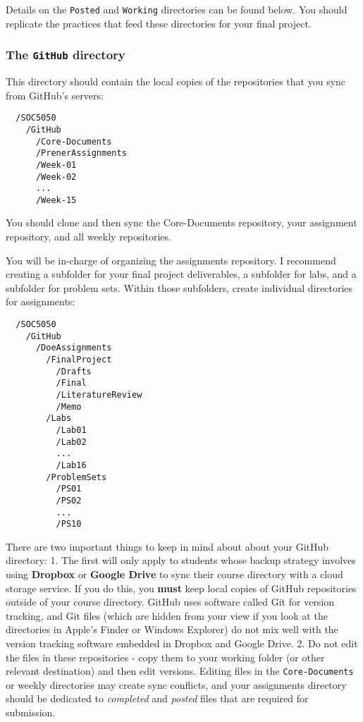 \documentclass[]{book}
\begin{document}
Details on the \texttt{Posted} and \texttt{Working} directories can be
found below. You should replicate the practices that feed these
directories for your final project.

\subsubsection{\texorpdfstring{The \texttt{GitHub}
directory}{The GitHub directory}}\label{the-github-directory}

This directory should contain the local copies of the repositories that
you sync from GitHub's servers:

\begin{verbatim}
  /SOC5050
    /GitHub
      /Core-Documents
      /PrenerAssignments
      /Week-01
      /Week-02
      ...
      /Week-15
\end{verbatim}

You should clone and then sync the Core-Documents repository, your
assignment repository, and all weekly repositories.

You will be in-charge of organizing the assignments repository. I
recommend creating a subfolder for your final project deliverables, a
subfolder for labs, and a subfolder for problem sets. Within those
subfolders, create individual directories for assignments:

\begin{verbatim}
  /SOC5050
    /GitHub
      /DoeAssignments
        /FinalProject
          /Drafts
          /Final
          /LiteratureReview
          /Memo
        /Labs
          /Lab01
          /Lab02
          ...
          /Lab16
        /ProblemSets
          /PS01
          /PS02
          ...
          /PS10
\end{verbatim}

There are two important things to keep in mind about about your GitHub
directory: 1. The first will only apply to students whose backup
strategy involves using \textbf{Dropbox} or \textbf{Google Drive} to
sync their course directory with a cloud storage service. If you do
this, you \textbf{must} keep local copies of GitHub repositories outside
of your course directory. GitHub uses software called Git for version
tracking, and Git files (which are hidden from your view if you look at
the directories in Apple's Finder or Windows Explorer) do not mix well
with the version tracking software embedded in Dropbox and Google Drive.
2. Do not edit the files in these repositories - copy them to your
working folder (or other relevant destination) and then edit versions.
Editing files in the \texttt{Core-Documents} or weekly directories may
create sync conflicts, and your assignments directory should be
dedicated to \emph{completed} and \emph{posted} files that are required
for submission.
\end{document}
